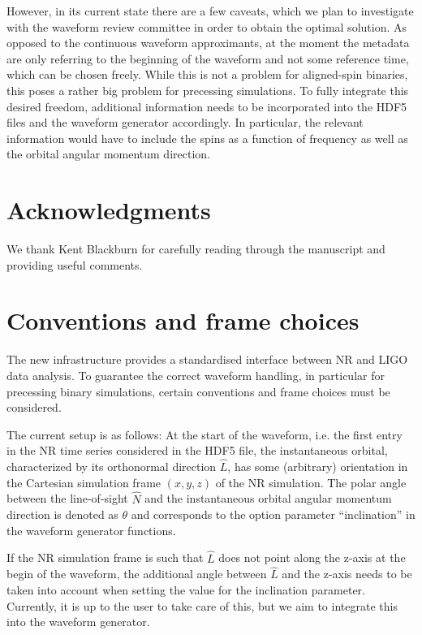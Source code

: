 \documentclass[aps,prd,amssymb,amsmath,amsfonts,superscriptaddress,
floatfix ,preprintnumbers,altaffilletter]{revtex4}
\begin{document}
However, in its current state there are a few caveats, which we plan to investigate with the waveform review committee
in order to obtain the optimal solution. As opposed to the continuous waveform approximants, at the moment the metadata
are only referring to the beginning of the waveform and not some reference time, which can be chosen freely. While this is 
not a problem for aligned-spin binaries, this poses a rather big problem for precessing simulations. To fully integrate this
desired freedom, additional information needs to be incorporated into the HDF5 files and the waveform generator
accordingly. In particular, the relevant information would have to include the spins as a function of frequency as well
as the orbital angular momentum direction. 

\section*{Acknowledgments}
We thank Kent Blackburn for carefully reading through the manuscript and providing useful comments.

\appendix
\section{Conventions and frame choices}
\label{sec:conv}
The new infrastructure provides a standardised interface between NR and LIGO data analysis. To guarantee
the correct waveform handling, in particular for precessing binary simulations, certain conventions and frame
choices must be considered. 

The current setup is as follows: At the start of the waveform, i.e. the first entry in the NR time series considered in the
HDF5 file, the instantaneous orbital, characterized by its orthonormal direction $\hat{L}$, has some (arbitrary) orientation
in the Cartesian simulation frame $(x, y, z)$ of the NR simulation. The polar angle between the line-of-sight $\hat{N}$ and the instantaneous orbital angular momentum direction is denoted as $\theta$ and corresponds to the option parameter ``inclination'' in the waveform generator functions. 

If the NR simulation frame is such that $\hat{L}$ does not point along the z-axis at the begin of the waveform, the additional angle between $\hat{L}$ and the z-axis needs to be taken into account when setting the value for the inclination parameter. Currently, it is up to the user to take care of this, but we aim to integrate this into the waveform generator. 
\end{document}
